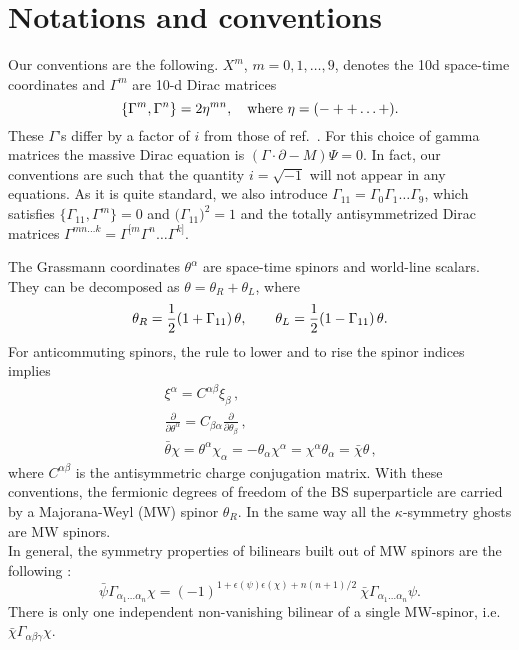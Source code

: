 \documentclass[a4paper,12pt]{article}
\begin{document}

\appendix

\section{Notations and conventions}
\label{app:notations}

Our conventions are the following.  $X^m$, $m = 0, 1,\ldots, 9$,
denotes the 10d 
space-time coordinates and $\Gamma^m$ are 10-d Dirac matrices 
\begin{equation}
\{\Gamma^m, \Gamma^n\} = 2\eta^{mn}, \quad {\rm where}~ \eta = (- ++ \ldots +).
\end{equation}
These $\Gamma$'s differ by a factor of $i$ from those of
ref.~\cite{green3}.  For this choice of gamma matrices the massive
Dirac equation is $(\Gamma\cdot\partial - M)\Psi =0$.  In fact, our
conventions are such that the quantity $i=\sqrt{-1}$ will not appear
in any equations. As it is quite standard, we also introduce
$\Gamma_{11} = \Gamma_{0}\Gamma_{1}\ldots \Gamma_{9}$, which satisfies
$\{ \Gamma_{11}, \Gamma^m \} =0$ and $\big(\Gamma_{11}\big)^2 =1$ and
the totally antisymmetrized Dirac matrices $\Gamma^{m n \dots k} =
\Gamma^{[m}\Gamma^{n}\ldots \Gamma^{k]}$.

The Grassmann coordinates $\theta^\alpha$ are space-time spinors 
and world-line scalars. They can be decomposed as
$\theta = \theta_R + \theta_L$, where
\begin{equation}
\theta_R = {1 \over 2} (1 + \Gamma_{11})\,\theta, \qquad 
\theta_L = {1 \over 2}(1 - \Gamma_{11})\,\theta. \label{thetas}
\end{equation}
For anticommuting spinors, the  rule to lower and to rise the spinor
indices implies 
\begin{eqnarray}
  \label{ch_1}
&& \xi^\alpha = C^{\alpha \beta} \xi_\beta\,, \nonumber \\
&& \frac{\partial}{\partial\theta^\alpha} = C_{\beta\alpha}
\frac{\partial}{\partial\theta_\beta}\,, \\ 
&& \bar\theta \chi = \theta^\alpha \chi_\alpha = - \theta_\alpha
\chi^\alpha =  \chi^\alpha  \theta_\alpha = \bar\chi \theta\,, 
\nonumber 
\end{eqnarray}
where $ C^{\alpha \beta}$ is the antisymmetric charge conjugation
matrix.  With these conventions, the fermionic degrees of freedom of
the BS superparticle are carried by a Majorana-Weyl (MW) spinor
$\theta_R$. In the same way
all the $\kappa$-symmetry ghosts are MW spinors. \\
In general, the symmetry properties of bilinears built out of MW
spinors are the following \cite{bergshoeff}:
\begin{equation}
  \bar\psi \Gamma_{\alpha_1 \ldots \alpha_n} \chi =
  (-1)^{1+\epsilon(\psi)\epsilon(\chi)+n(n+1)/2} ~\bar\chi
  \Gamma_{\alpha_1 \ldots \alpha_n} \psi .
\end{equation}
There is only one independent non-vanishing bilinear of a single
MW-spinor, i.e. $\bar\chi
\Gamma_{\alpha \beta \gamma} \chi$.
\end{document}
